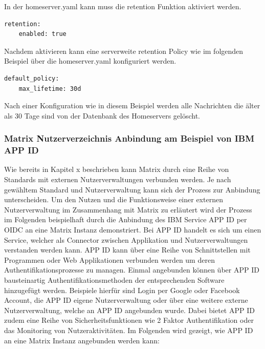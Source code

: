 In der homeserver.yaml kann muss die retention Funktion aktiviert werden.

\begin{lstlisting}
retention:
    enabled: true
\end{lstlisting}

Nachdem aktivieren kann eine serverweite retention Policy wie im folgenden Beispiel über die homeserver.yaml konfiguriert werden.

\begin{lstlisting}
default_policy:
    max_lifetime: 30d
\end{lstlisting}

Nach einer Konfiguration wie in diesem Beispiel werden alle Nachrichten die älter als 30 Tage sind von der Datenbank des Homeservers gelöscht.

\subsubsection{Matrix Nutzerverzeichnis Anbindung am Beispiel von IBM APP ID}\label{chapter:vdmf}
Wie bereits in Kapitel x beschrieben kann Matrix durch eine Reihe von Standards mit externen Nutzerverwaltungen verbunden werden.
Je nach gewähltem Standard und Nutzerverwaltung kann sich der Prozess zur Anbindung unterscheiden. Um den Nutzen und die Funktionsweise einer externen Nutzerverwaltung im Zusammenhang mit Matrix zu erläutert wird der Prozess im Folgenden beispielhaft durch die Anbindung des IBM Service APP ID per OIDC an eine Matrix Instanz demonstriert. Bei APP ID handelt es sich um einen Service, welcher als Connector zwischen Applikation und Nutzerverwaltungen verstanden werden kann. APP ID kann über eine Reihe von Schnittstellen mit Programmen oder Web Applikationen verbunden werden um deren Authentifikationsprozesse zu managen. Einmal angebunden können über APP ID bausteinartig Authentifikationsmethoden der entsprechenden Software hinzugefügt werden. Beispiele hierfür sind Login per Google oder Facebook Account, die APP ID eigene Nutzerverwaltung oder über eine weitere externe Nutzerverwaltung, welche an APP ID angebunden wurde. Dabei bietet APP ID zudem eine Reihe von Sicherheitsfunktionen wie 2 Faktor Authentifikation oder das Monitoring von Nutzeraktivitäten.
Im Folgenden wird gezeigt, wie APP ID an eine Matrix Instanz angebunden werden kann:

